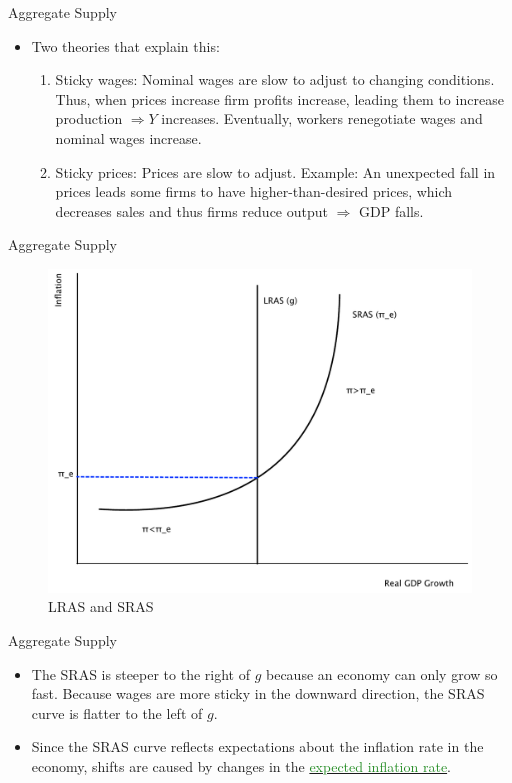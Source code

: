 \documentclass[xcolor={dvipsnames},pdf, hyperref={colorlinks=true, citecolor=ForestGreen, linkcolor=BlueViolet, urlcolor=Magenta}]{beamer}
\theoremstyle{definition}
\newcommand{\dd}[1]{{\underline{\textcolor{ForestGreen}{#1}}}}
\begin{document}
\begin{frame}{Aggregate Supply}
	\begin{itemize}
		\item Two theories that explain this:
		\begin{enumerate}
			\item Sticky wages: Nominal wages are slow to adjust to changing conditions. Thus, when prices increase firm profits increase, leading them to increase production $\Rightarrow Y$ increases. Eventually, workers renegotiate wages and nominal wages increase.
			\item Sticky prices: Prices are slow to adjust. Example: An unexpected fall in prices leads some firms to have higher-than-desired prices, which decreases sales and thus firms reduce output $\Rightarrow$ GDP falls.
		\end{enumerate}
	\end{itemize}
\end{frame}


\begin{frame}{Aggregate Supply}
	\begin{figure}[H]
	\centering
	\includegraphics[scale=.40]{plot97.pdf}
	\caption{LRAS and SRAS}
\end{figure}
\end{frame}

\begin{frame}{Aggregate Supply}
	\begin{itemize}
		\item The SRAS is steeper to the right of $g$ because an economy can only grow so fast. Because wages are more sticky in the downward direction, the SRAS curve is flatter to the left of $g$.
		\item Since the SRAS curve reflects expectations about the inflation rate in the economy, shifts are caused by changes in the \dd{expected inflation rate}.
	
		
	\end{itemize}
\end{frame}
\end{document}
